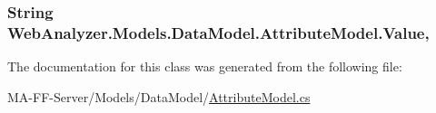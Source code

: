 \subsubsection[{Value}]{\setlength{\rightskip}{0pt plus 5cm}String Web\+Analyzer.\+Models.\+Data\+Model.\+Attribute\+Model.\+Value\hspace{0.3cm}{\ttfamily [get]}, {\ttfamily [set]}}\label{class_web_analyzer_1_1_models_1_1_data_model_1_1_attribute_model_a132abb603aaf2d5bd36c3c3477b1c21d}


The documentation for this class was generated from the following file\+:\begin{DoxyCompactItemize}
\item 
M\+A-\/\+F\+F-\/\+Server/\+Models/\+Data\+Model/\hyperlink{_attribute_model_8cs}{Attribute\+Model.\+cs}\end{DoxyCompactItemize}
